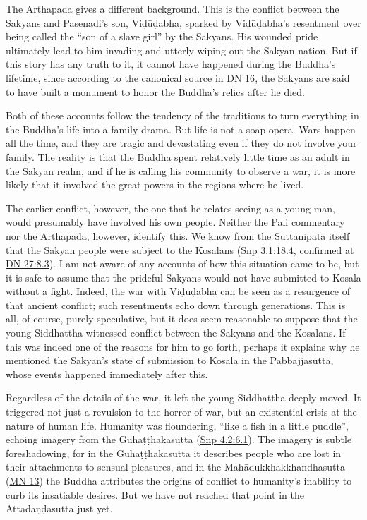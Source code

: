 \documentclass[12pt,openany]{book}%
\begin{document}
The Arthapada gives a different background. This is the conflict between the Sakyans and Pasenadi’s son, \textsanskrit{Viḍūḍabha}, sparked by \textsanskrit{Viḍūḍabha}’s resentment over being called the “son of a slave girl” by the Sakyans. His wounded pride ultimately lead to him invading and utterly wiping out the Sakyan nation. But if this story has any truth to it, it cannot have happened during the Buddha’s lifetime, since according to the canonical source in \href{https://suttacentral.net/dn16/en/sujato}{DN 16}, the Sakyans are said to have built a monument to honor the Buddha’s relics after he died.

Both of these accounts follow the tendency of the traditions to turn everything in the Buddha’s life into a family drama. But life is not a soap opera. Wars happen all the time, and they are tragic and devastating even if they do not involve your family. The reality is that the Buddha spent relatively little time as an adult in the Sakyan realm, and if he is calling his community to observe a war, it is more likely that it involved the great powers in the regions where he lived.

The earlier conflict, however, the one that he relates seeing as a young man, would presumably have involved his own people. Neither the Pali commentary nor the Arthapada, however, identify this. We know from the \textsanskrit{Suttanipāta} itself that the Sakyan people were subject to the Kosalans (\href{https://suttacentral.net/snp3.1/en/sujato\#18.4}{Snp 3.1:18.4}, confirmed at \href{https://suttacentral.net/dn27/en/sujato\#8.3}{DN 27:8.3}). I am not aware of any accounts of how this situation came to be, but it is safe to assume that the prideful Sakyans would not have submitted to Kosala without a fight. Indeed, the war with \textsanskrit{Viḍūḍabha} can be seen as a resurgence of that ancient conflict; such resentments echo down through generations. This is all, of course, purely speculative, but it does seem reasonable to suppose that the young Siddhattha witnessed conflict between the Sakyans and the Kosalans. If this was indeed one of the reasons for him to go forth, perhaps it explains why he mentioned the Sakyan’s state of submission to Kosala in the \textsanskrit{Pabbajjāsutta}, whose events happened immediately after this.

Regardless of the details of the war, it left the young Siddhattha deeply moved. It triggered not just a revulsion to the horror of war, but an existential crisis at the nature of human life. Humanity was floundering, “like a fish in a little puddle”, echoing imagery from the \textsanskrit{Guhaṭṭhakasutta} (\href{https://suttacentral.net/snp4.2/en/sujato\#6.1}{Snp 4.2:6.1}). The imagery is subtle foreshadowing, for in the \textsanskrit{Guhaṭṭhakasutta} it describes people who are lost in their attachments to sensual pleasures, and in the \textsanskrit{Mahādukkhakkhandhasutta} (\href{https://suttacentral.net/mn13/en/sujato}{MN 13}) the Buddha attributes the origins of conflict to humanity’s inability to curb its insatiable desires. But we have not reached that point in the \textsanskrit{Attadaṇḍasutta} just yet.
\end{document}
